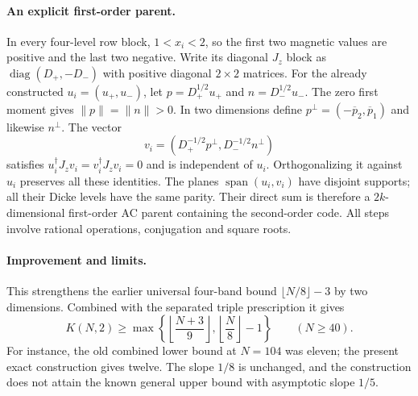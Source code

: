 \documentclass[11pt]{article}
\begin{document}
\paragraph{An explicit first-order parent.}
In every four-level row block, $1<x_i<2$, so the first two magnetic values
are positive and the last two negative. Write its diagonal $J_z$ block as
$\operatorname{diag}(D_+,-D_-)$ with positive diagonal $2\times2$ matrices.
For the already constructed $u_i=(u_+,u_-)$, let
$p=D_+^{1/2}u_+$ and $n=D_-^{1/2}u_-$. The zero first moment gives
$\|p\|=\|n\|>0$. In two dimensions define
$p^\perp=(-\overline p_2,\overline p_1)$ and likewise $n^\perp$.
The vector
\[
 v_i=(D_+^{-1/2}p^\perp,D_-^{-1/2}n^\perp)
\]
satisfies $u_i^\dagger J_zv_i=v_i^\dagger J_zv_i=0$ and is independent
of $u_i$. Orthogonalizing it against $u_i$ preserves all these identities.
The planes $\operatorname{span}(u_i,v_i)$ have disjoint supports; all their
Dicke levels have the same parity. Their direct sum is therefore a
$2k$-dimensional first-order AC parent containing the second-order code.
All steps involve rational operations, conjugation and square roots.

\paragraph{Improvement and limits.}
This strengthens the earlier universal four-band bound
$\lfloor N/8\rfloor-3$ by two dimensions. Combined with the separated
triple prescription it gives
\[
 K(N,2)\ge\max\left\{
 \left\lfloor\frac{N+3}{9}\right\rfloor,
 \left\lfloor\frac N8\right\rfloor-1\right\}\qquad(N\ge40).
\]
For instance, the old combined lower bound at $N=104$ was eleven;
the present exact construction gives twelve. The slope $1/8$ is
unchanged, and the construction does not attain the known general
upper bound with asymptotic slope $1/5$.
\end{document}
